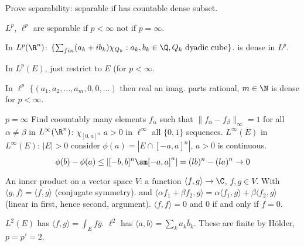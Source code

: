 

Prove separability: separable if has countable dense subset. 

\begin{thm}
$L^p$, $\ell^p$ are separable if $p<\infty$ not if $p=\infty$.

In $L^p(\R^n)$: $\{ \sum_{fin} (a_k+ib_k) \chi_{Q_k}: a_k,b_k \in \Q, Q_k \text{ dyadic cube}\}$. is dense in $L^p$.

In $L^p(E)$, just restrict to $E$ (for $p<\infty$.

In $\ell^p$ $\{(a_1,a_2,\ldots,a_m,0,0,\ldots)$ then real an imag. parts rational, $m \in \N$ is dense for $p<\infty$. 


$p=\infty$ Find coountably many elements $f_\alpha$ such that $\|f_\alpha-f_\beta\|_\infty=1$ for all $\alpha \neq \beta$ in $L^\infty(\R^n)$: $\chi_{[0,a]^n}$ $a>0$ in $\ell^\infty$ all $\{0,1\}$ sequences. $L^\infty(E)$ in $L^\infty(E)$: $|E|>0$ consider $\phi(a)= |E \cap [-a,a]^n|$, $a>0$ is continuous. 
	\[
	\phi(b)-\phi(a) \leq |[-b,b]^n \sm [-a,a]^n| = (lb)^n - (la)^n \to 0
	\] 
\end{thm}





An inner product on a vector space $V$: a function $\langle f,g \rangle \to \C$, $f,g \in V$. With $\langle g,f \rangle = \overline{\langle f,g \rangle}$ (conjugate symmetry). and $\langle \alpha f_1+\beta f_2, g \rangle = \alpha \langle f_1,g \rangle + \beta \langle f_2,g \rangle$ (linear in first, hence second, argument). $\langle f,f \rangle=0$ and $0$ if and only if $f=0$. 


\begin{ex}
$L^2(E)$ has $\langle f,g \rangle = \int_E f \overline{g}$. $\ell^2$ has $\langle a,b \rangle = \sum_k a_k \overline{b}_k$. These are finite by H\"older, $p=p'=2$. 
\end{ex}


